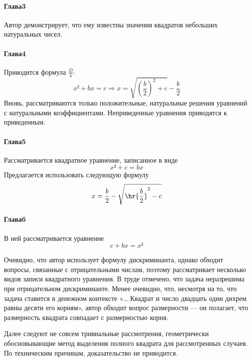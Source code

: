 \documentclass[unicode, 10pt, a4paper, oneside, fleqn]{article}
\begin{document}
\paragraph{Глава3}
Автор демонстрирует, что ему известны значения квадратов небольших
натуральных чисел.
\paragraph{Глава4}
Приводится формула $\frac{D}{4}$:
\begin{displaymath}
  x²+bx = c ⇒ x = \sqrt{\left(\frac{b}{2}\right)^2 +c} - \frac{b}{2}
\end{displaymath}
Вновь, рассматриваются только положительные, натуральные решения уравнений с
натуральными коэффициентами. Неприведенные уравнения приводятся к приведенным.
\paragraph{Глава5}
Рассматривается квадратное уравнение, записанное в виде
\begin{displaymath}
 x² + c = bx
\end{displaymath}
Предлагается использовать следующую формулу
\begin{displaymath}
  x = \frac{b}{2} - \sqrt{\hr{\frac{b}{2}}^2 - c}
\end{displaymath}
\paragraph{Глава6}
В ней рассматривается уравнение
\begin{displaymath}
  c + bx = x²
\end{displaymath}
\begin{note}
  Очевидно, что автор использует формулу дискриминанта, однако
  обходит вопросы, связанные с отрицательными числам, поэтому
  рассматривает несколько видов записи квадратного уравнения. В труде отмечено,
  что задача неразрешима при отрицательном дискриминанте. Менее очевидно,
  что, несмотря на то, что задача ставится в денежном контексте
  «… Квадрат и число двадцать один дихрем равны десяти его корням», автор
  обходит вопрос размерности — он полагает, что размерность квадрата совпадает
  с размерностью корня.
\end{note}
\par
Далее следуют не совсем тривиальные рассмотрения, геометрически обосновывающие
метод выделения полного квадрата для рассмотренных случаев. По техническим причинам,
доказательство не приводится.
\end{document}
